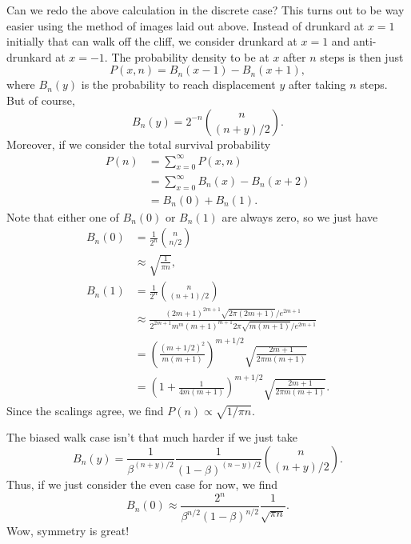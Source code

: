 \documentclass[12pt]{report}
\newcommand*{\p}[1]{\left(#1\right)}
\begin{document}
Can we redo the above calculation in the discrete case? This turns out to be way
easier using the method of images laid out above. Instead of drunkard at $x = 1$
initially that can walk off the cliff, we consider drunkard at $x = 1$ and
anti-drunkard at $x = -1$. The probability density to be at $x$ after $n$ steps
is then just
\begin{equation}
    P(x, n) = B_n(x - 1) - B_n(x + 1),
\end{equation}
where $B_n(y)$ is the probability to reach displacement $y$ after taking $n$
steps. But of course,
\begin{equation}
    B_n(y) = 2^{-n}\binom{n}{(n + y) / 2}.
\end{equation}
Moreover, if we consider the total survival probability
\begin{align}
    P(n) &= \sum_{x = 0}^\infty P(x, n)\nonumber\\
        &= \sum_{x = 0}^\infty B_n(x) - B_n(x + 2)\nonumber\\
        &= B_n(0) + B_n(1).
\end{align}
Note that either one of $B_n(0)$ or $B_n(1)$ are always zero, so we just have
\begin{align}
    B_n(0) &= \frac{1}{2^n}\binom{n}{n/2}\nonumber\\
        &\approx \sqrt{\frac{1}{\pi n}},\\
    B_n(1) &= \frac{1}{2^n}\binom{n}{(n + 1)/2}\nonumber\\
        &\approx \frac{(2m + 1)^{2m + 1}\sqrt{2\pi(2m + 1)} / e^{2m + 1}}{
            2^{2m+1}m^m\p{m+1}^{m+1}2\pi\sqrt{m(m+1)}/e^{2m+1}}\nonumber\\
        &= \p{\frac{(m+1/2)^2}{m(m+1)}}^{m+1/2}
            \sqrt{\frac{2m+1}{2\pi m(m+1)}}\nonumber\\
        &= \p{1 + \frac{1}{4m(m+1)}}^{m+1/2}
            \sqrt{\frac{2m+1}{2\pi m(m+1)}}.
\end{align}
Since the scalings agree, we find $P(n) \propto \sqrt{1/\pi n}$.

The biased walk case isn't that much harder if we just take
\begin{equation}
    B_n(y) = \frac{1}{\beta^{(n+y)/2}}\frac{1}{\p{1 - \beta}^{(n-y)/2}}
        \binom{n}{(n + y) / 2}.
\end{equation}
Thus, if we just consider the even case for now, we find
\begin{equation}
    B_n(0) \approx \frac{2^n}{\beta^{n/2}\p{1 - \beta}^{n/2}}
        \frac{1}{\sqrt{\pi n}}.
\end{equation}
Wow, symmetry is great!
\end{document}
